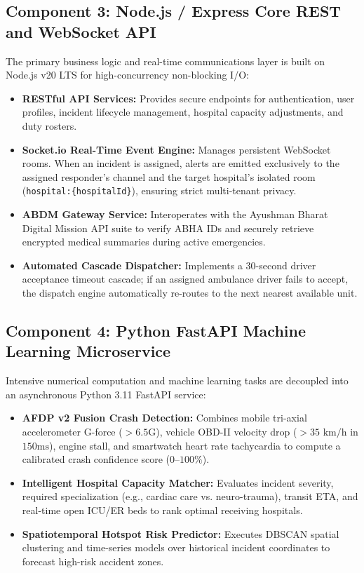 \documentclass[12pt,a4paper]{article}
\begin{document}
\clearpage
\subsection{Component 3: Node.js / Express Core REST and WebSocket API}
The primary business logic and real-time communications layer is built on Node.js v20 LTS for high-concurrency non-blocking I/O:
\begin{itemize}
    \item \textbf{RESTful API Services:} Provides secure endpoints for authentication, user profiles, incident lifecycle management, hospital capacity adjustments, and duty rosters.
    \item \textbf{Socket.io Real-Time Event Engine:} Manages persistent WebSocket rooms. When an incident is assigned, alerts are emitted exclusively to the assigned responder's channel and the target hospital's isolated room (\texttt{hospital:\{hospitalId\}}), ensuring strict multi-tenant privacy.
    \item \textbf{ABDM Gateway Service:} Interoperates with the Ayushman Bharat Digital Mission API suite to verify ABHA IDs and securely retrieve encrypted medical summaries during active emergencies.
    \item \textbf{Automated Cascade Dispatcher:} Implements a 30-second driver acceptance timeout cascade; if an assigned ambulance driver fails to accept, the dispatch engine automatically re-routes to the next nearest available unit.
\end{itemize}

\subsection{Component 4: Python FastAPI Machine Learning Microservice}
Intensive numerical computation and machine learning tasks are decoupled into an asynchronous Python 3.11 FastAPI service:
\begin{itemize}
    \item \textbf{AFDP v2 Fusion Crash Detection:} Combines mobile tri-axial accelerometer G-force ($>6.5\text{G}$), vehicle OBD-II velocity drop ($>35\text{ km/h}$ in $150\text{ms}$), engine stall, and smartwatch heart rate tachycardia to compute a calibrated crash confidence score ($0\text{--}100\%$).
    \item \textbf{Intelligent Hospital Capacity Matcher:} Evaluates incident severity, required specialization (e.g., cardiac care vs. neuro-trauma), transit ETA, and real-time open ICU/ER beds to rank optimal receiving hospitals.
    \item \textbf{Spatiotemporal Hotspot Risk Predictor:} Executes DBSCAN spatial clustering and time-series models over historical incident coordinates to forecast high-risk accident zones.
\end{itemize}
\end{document}
